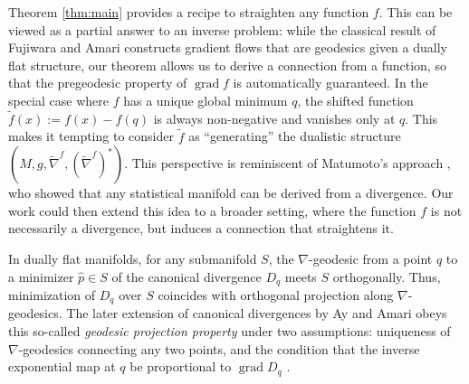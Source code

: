 \documentclass{amsart}
\theoremstyle{definition}
\begin{document}
Theorem \ref{thm:main} provides a recipe to straighten any function $f$. This can be viewed as a partial answer to an inverse problem: while the classical result of Fujiwara and Amari constructs gradient flows that are geodesics given a dually flat structure, our theorem allows us to derive a connection from a function, so that the pregeodesic property of $\operatorname{grad} f$ is automatically guaranteed.
In the special case where $f$ has a unique global minimum $q$, the shifted function $\tilde f(x):=f(x)-f(q)$ 
is always non-negative and vanishes only at $q$. 
This makes it tempting to consider $\tilde f$ as ``generating''
the dualistic structure $(M,g,\tilde\nabla^f,(\tilde\nabla^f)^*)$. %
This perspective is reminiscent of Matumoto's approach \cite{matumoto_any_1993}, who showed that any statistical manifold can be derived from a divergence. 
Our work could then extend this idea to a broader setting, where the function $f$ is not necessarily a divergence, but induces a connection that straightens it. %

In dually flat manifolds, for any submanifold $S$,
the $\nabla$-geodesic from a point $q$ to a minimizer $\hat{p} \in S$ of the canonical divergence $D_q$ meets $S$ orthogonally. 
Thus, minimization of $D_q$ over $S$ coincides with orthogonal projection along $\nabla$-geodesics. The later extension of canonical divergences by Ay and Amari obeys this so-called \textit{geodesic projection property} under two assumptions: uniqueness of $\nabla$-geodesics connecting any two points, and the condition that the inverse exponential map at $q$ be proportional to $\operatorname{grad} D_q$ \cite{ay_novel_2015}. 
\end{document}
